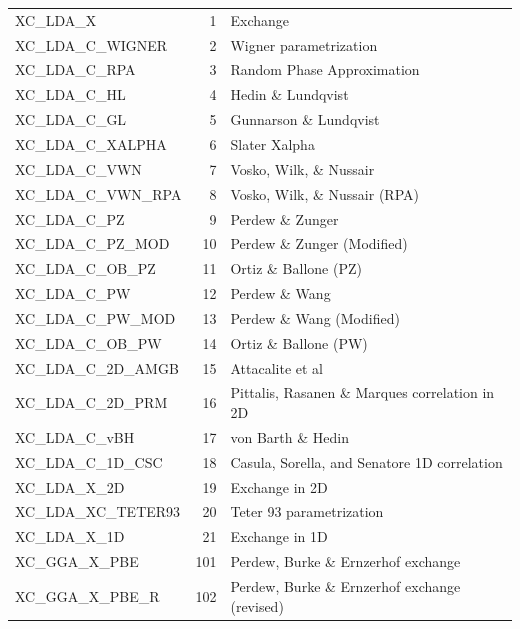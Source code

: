\documentclass[a4paper,11pt]{report}
\begin{document}
\begin{longtable}{lrl}
   XC\_LDA\_X                 &   1  &  Exchange                     \\
   XC\_LDA\_C\_WIGNER         &   2  &  Wigner parametrization       \\
   XC\_LDA\_C\_RPA            &   3  &  Random Phase Approximation   \\
   XC\_LDA\_C\_HL             &   4  &  Hedin \& Lundqvist            \\
   XC\_LDA\_C\_GL             &   5  &  Gunnarson \& Lundqvist        \\
   XC\_LDA\_C\_XALPHA         &   6  &  Slater Xalpha                \\
   XC\_LDA\_C\_VWN            &   7  &  Vosko, Wilk, \& Nussair       \\
   XC\_LDA\_C\_VWN\_RPA       &   8  &  Vosko, Wilk, \& Nussair (RPA) \\
   XC\_LDA\_C\_PZ             &   9  &  Perdew \& Zunger              \\
   XC\_LDA\_C\_PZ\_MOD        &  10  &  Perdew \& Zunger (Modified)   \\
   XC\_LDA\_C\_OB\_PZ         &  11  &  Ortiz \& Ballone (PZ)         \\
   XC\_LDA\_C\_PW             &  12  &  Perdew \& Wang                \\
   XC\_LDA\_C\_PW\_MOD        &  13  &  Perdew \& Wang (Modified)     \\
   XC\_LDA\_C\_OB\_PW         &  14  &  Ortiz \& Ballone (PW)         \\
   XC\_LDA\_C\_2D\_AMGB       &  15  &  Attacalite et al             \\
   XC\_LDA\_C\_2D\_PRM        &  16  &  Pittalis, Rasanen \& Marques correlation in 2D \\
   XC\_LDA\_C\_vBH            &  17  &  von Barth \& Hedin            \\
   XC\_LDA\_C\_1D\_CSC        &  18  &  Casula, Sorella, and Senatore 1D correlation     \\
   XC\_LDA\_X\_2D             &  19  &  Exchange in 2D \\
   XC\_LDA\_XC\_TETER93       &  20  &  Teter 93 parametrization                \\
   XC\_LDA\_X\_1D             &  21  &  Exchange in 1D     \\
   XC\_GGA\_X\_PBE            & 101  &  Perdew, Burke \& Ernzerhof exchange             \\
   XC\_GGA\_X\_PBE\_R         & 102  &  Perdew, Burke \& Ernzerhof exchange (revised)   \\

\end{longtable}
\end{document}
